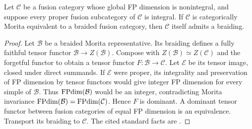 \begin{proposition}
\label{prop:research-minimal-tensor-image}
Let $\mathcal C$ be a fusion category whose global FP dimension is
nonintegral, and suppose every proper fusion subcategory of $\mathcal C$
is integral.  If $\mathcal C$ is categorically Morita equivalent to a
braided fusion category, then $\mathcal C$ itself admits a braiding.
\end{proposition}
\begin{proof}
Let $\mathcal B$ be a braided Morita representative.  Its braiding
defines a fully faithful tensor functor $\mathcal B\to Z(\mathcal B)$.
Compose with $Z(\mathcal B)\simeq Z(\mathcal C)$ and the forgetful
functor to obtain a tensor functor $F:\mathcal B\to\mathcal C$.
Let $\mathcal E$ be its tensor image, closed under direct summands.
If $\mathcal E$ were proper, its integrality and preservation of FP
dimension by tensor functors would give integer FP dimension for
every simple of $\mathcal B$.  Thus $\operatorname{FPdim}(\mathcal B)$ would be
an integer, contradicting Morita invariance
$\operatorname{FPdim}(\mathcal B)=\operatorname{FPdim}(\mathcal C)$.
Hence $F$ is dominant.  A dominant tensor functor between fusion
categories of equal FP dimension is an equivalence.  Transport its
braiding to $\mathcal C$.  The cited standard facts are
\cite[Proposition~6.3.4, Corollary~7.16.7 and
Theorem~8.12.3]{EGNO}.
\end{proof}

